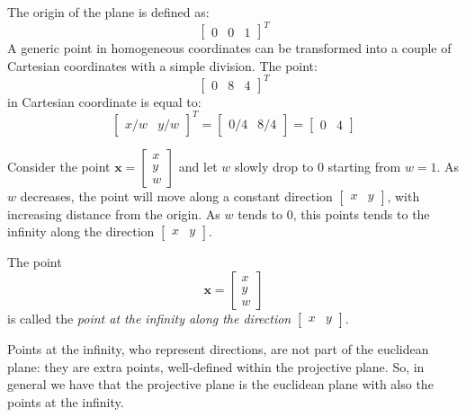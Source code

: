 \documentclass[12pt, a4paper]{report}
\begin{document}
    \begin{example}
        The origin of the plane is defined as:
        \[{\begin{bmatrix} 0 & 0 & 1 \end{bmatrix}}^T\]
        A generic point in homogeneous coordinates can be transformed into a couple of Cartesian coordinates with a simple division. The point:
        \[{\begin{bmatrix} 0 & 8 & 4 \end{bmatrix}}^T\]
        in Cartesian coordinate is equal to: 
        \[{\begin{bmatrix} x/w & y/w  \end{bmatrix}}^T=\begin{bmatrix} 0/4 & 8/4 \end{bmatrix}=\begin{bmatrix} 0 & 4 \end{bmatrix}\]
    \end{example}
    Consider the point $\boldsymbol{x}=\begin{bmatrix} x \\ y \\ w \end{bmatrix}$ and let $w$ slowly drop to $0$ starting from $w=1$. As $w$ decreases, the point will move along a 
    constant direction $\begin{bmatrix} x & y \end{bmatrix}$, with increasing distance from the origin. As $w$ tends to $0$, this points tends to the infinity along the direction 
    $\begin{bmatrix} x & y \end{bmatrix}$. 
    \begin{definition}
        The point \[\boldsymbol{x} = \begin{bmatrix} x \\ y \\ w \end{bmatrix}\] is called the \emph{point at the infinity along the direction} $\begin{bmatrix} x & y \end{bmatrix}$. 
    \end{definition}
    Points at the infinity, who represent directions, are not part of the euclidean plane: they are extra points, well-defined within the projective plane. So, in general we have
    that the projective plane is the euclidean plane with also the points at the infinity. 
\end{document}
